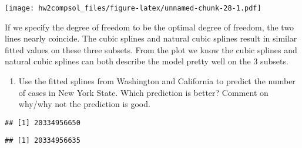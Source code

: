 \documentclass[]{article}
\newenvironment{Shaded}{\begin{snugshade}}{\end{snugshade}}
\newcommand{\CommentTok}[1]{\textcolor[rgb]{0.56,0.35,0.01}{\textit{#1}}}
\newcommand{\DataTypeTok}[1]{\textcolor[rgb]{0.13,0.29,0.53}{#1}}
\newcommand{\DecValTok}[1]{\textcolor[rgb]{0.00,0.00,0.81}{#1}}
\newcommand{\KeywordTok}[1]{\textcolor[rgb]{0.13,0.29,0.53}{\textbf{#1}}}
\newcommand{\NormalTok}[1]{#1}
\newcommand{\OperatorTok}[1]{\textcolor[rgb]{0.81,0.36,0.00}{\textbf{#1}}}
\newcommand{\StringTok}[1]{\textcolor[rgb]{0.31,0.60,0.02}{#1}}
\providecommand{\tightlist}{%
  \setlength{\itemsep}{0pt}\setlength{\parskip}{0pt}}
\begin{document}
\texttt{[image: hw2compsol\_files/figure-latex/unnamed-chunk-28-1.pdf]}

If we specify the degree of freedom to be the optimal degree of freedom,
the two lines nearly coincide. The cubic splines and natural cubic
splines result in similar fitted values on these three subsets. From the
plot we know the cubic splines and natural cubic splines can both
describe the model pretty well on the 3 subsets.

\begin{enumerate}
\def\labelenumi{(\alph{enumi})}
\setcounter{enumi}{3}
\tightlist
\item
  Use the fitted splines from Washington and California to predict the
  number of cases in New York State. Which prediction is better? Comment
  on why/why not the prediction is good.
\end{enumerate}

\begin{Shaded}
\end{Shaded}

\begin{verbatim}
## [1] 20334956650
\end{verbatim}

\begin{Shaded}
\end{Shaded}

\begin{verbatim}
## [1] 20334956635
\end{verbatim}

\begin{Shaded}
\end{Shaded}
\end{document}
